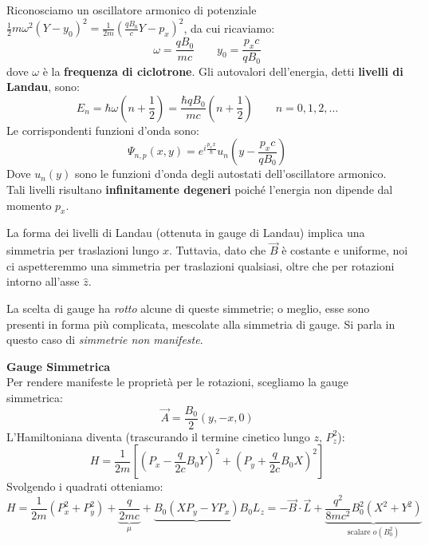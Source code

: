 
Riconosciamo un oscillatore armonico di potenziale \( \frac{1}{2} m \omega^2 (Y - y_0)^2 = \frac{1}{2m} \left( \frac{q B_0}{c} Y - p_x \right)^2 \), da cui ricaviamo:
\begin{equation}
    \omega = \frac{q B_0}{m c} \qquad y_0 = \frac{p_x c}{q B_0}
\end{equation}
dove \( \omega \) è la \textbf{frequenza di ciclotrone}. Gli autovalori dell'energia, detti \textbf{livelli di Landau}, sono:
\begin{equation}
    E_n = \hbar \omega \left( n + \frac{1}{2} \right) = \frac{\hbar q B_0}{m c} \left( n + \frac{1}{2} \right) \qquad n = 0, 1, 2, \dots
\end{equation}
Le corrispondenti funzioni d'onda sono:
\begin{equation}
    \Psi_{n, p}(x, y) = e^{i \frac{p_x x}{\hbar}} u_n \left( y - \frac{p_x c}{q B_0} \right)
\end{equation} 
Dove \(u_n(y) \) sono le funzioni d'onda degli autostati dell'oscillatore armonico.
Tali livelli risultano \textbf{infinitamente degeneri} poiché l'energia non dipende dal momento \( p_x \).

La forma dei livelli di Landau (ottenuta in gauge di Landau) implica una simmetria per traslazioni lungo \( x \). Tuttavia, dato che \( \vec{B} \) è costante e uniforme, noi ci aspetteremmo una simmetria per traslazioni qualsiasi, oltre che per rotazioni intorno all'asse \( \hat{z} \).

La scelta di gauge ha \textit{rotto} alcune di queste simmetrie; o meglio, esse sono presenti in forma più complicata, mescolate alla simmetria di gauge. Si parla in questo caso di \textit{simmetrie non manifeste}.

\begin{example}
    \textbf{Gauge Simmetrica}\\
    Per rendere manifeste le proprietà per le rotazioni, scegliamo la gauge simmetrica:
    \begin{equation}
        \vec{A} = \frac{B_0}{2} (y, -x, 0)
    \end{equation}
    L'Hamiltoniana diventa (trascurando il termine cinetico lungo \( z \), \( P_z^2 \)):
    \[
        H = \frac{1}{2m} \left[ \left( P_x - \frac{q}{2c} B_0 Y \right)^2 + \left( P_y + \frac{q}{2c} B_0 X \right)^2 \right]
    \]
    Svolgendo i quadrati otteniamo:
    \[
        H = \frac{1}{2m} (P_x^2 + P_y^2) + \underbrace{\frac{q}{2mc} }_{\mu}+ \underbrace{B_0 (X P_y - Y P_x)}{B_0L_z= -\vec{B}\cdot\vec{L}} + \underbrace{\frac{q^2}{8mc^2} B_0^2 (X^2 + Y^2)}_{\text{scalare } o(B_0^2)}
    \]
\end{example}

